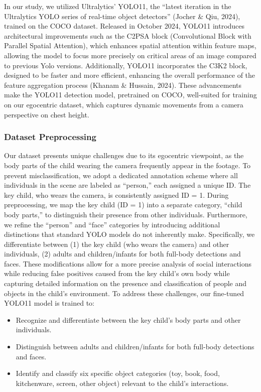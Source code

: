 \documentclass[
  man,floatsintext]{apa6}
\providecommand{\tightlist}{%
  \setlength{\itemsep}{0pt}\setlength{\parskip}{0pt}}
\begin{document}
In our study, we utilized Ultralytics' YOLO11, the ``latest iteration in the Ultralytics YOLO series of real-time object detectors'' (Jocher \& Qiu, 2024), trained on the COCO dataset. Released in October 2024, YOLO11 introduces architectural improvements such as the C2PSA block (Convolutional Block with Parallel Spatial Attention), which enhances spatial attention within feature maps, allowing the model to focus more precisely on critical areas of an image compared to previous Yolo versions. Additionally, YOLO11 incorporates the C3K2 block, designed to be faster and more efficient, enhancing the overall performance of the feature aggregation process (Khanam \& Hussain, 2024). These advancements make the YOLO11 detection model, pretrained on COCO, well-suited for training on our egocentric dataset, which captures dynamic movements from a camera perspective on chest height.

\subsubsection{Dataset Preprocessing}\label{dataset-preprocessing}

Our dataset presents unique challenges due to its egocentric viewpoint, as the body parts of the child wearing the camera frequently appear in the footage. To prevent misclassification, we adopt a dedicated annotation scheme where all individuals in the scene are labeled as ``person,'' each assigned a unique ID. The key child, who wears the camera, is consistently assigned ID = 1. During preprocessing, we map the key child (ID = 1) into a separate category, ``child body parts,'' to distinguish their presence from other individuals. Furthermore, we refine the ``person'' and ``face'' categories by introducing additional distinctions that standard YOLO models do not inherently make. Specifically, we differentiate between (1) the key child (who wears the camera) and other individuals, (2) adults and children/infants for both full-body detections and faces. These modifications allow for a more precise analysis of social interactions while reducing false positives caused from the key child's own body while capturing detailed information on the presence and classification of people and objects in the child's environment. To address these challenges, our fine-tuned YOLO11 model is trained to:

\begin{itemize}
\tightlist
\item
  Recognize and differentiate between the key child's body parts and other individuals.
\item
  Distinguish between adults and children/infants for both full-body detections and faces.
\item
  Identify and classify six specific object categories (toy, book, food, kitchenware, screen, other object) relevant to the child's interactions.
\end{itemize}
\end{document}
